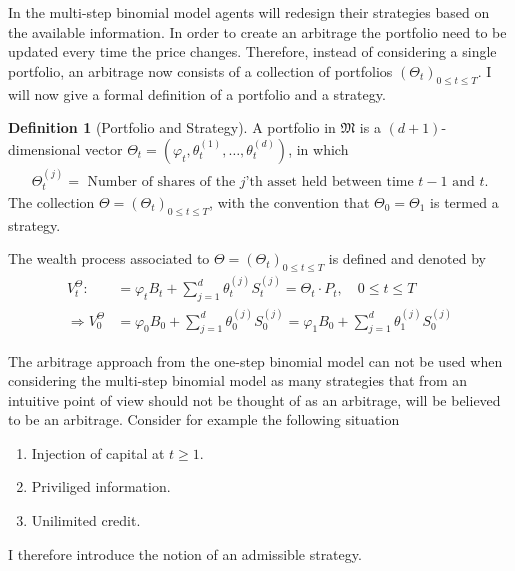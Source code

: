 \documentclass{article}
\theoremstyle{definition}
\newtheorem{definition}[theorem]{Definition}
\numberwithin{equation}{section}
\begin{document}
In the multi-step binomial model agents will redesign their strategies based on the available information.
In order to create an arbitrage the portfolio need to be updated every time the price changes.
Therefore, instead of considering a single portfolio, an arbitrage now consists of a collection of portfolios $\left(\Theta_t\right)_{0 \leq t \leq T}$.
I will now give a formal definition of a portfolio and a strategy.
\begin{definition}[Portfolio and Strategy]
    A portfolio in $\mathfrak{M}$ is a $(d + 1)$-dimensional vector $\Theta_t = \left(\varphi_t, \theta_t^{(1)}, \ldots, \theta_t^{(d)}\right)$, in which
    \begin{align}
        \Theta_t^{(j)} = \text{ Number of shares of the $j$'th asset held between time $t - 1$ and $t$.}
    \end{align}
    The collection $\Theta = \left(\Theta_t\right)_{0 \leq t \leq T}$, with the convention that $\Theta_0 = \Theta_1$ is termed a strategy.
    
    The wealth process associated to $\Theta = \left(\Theta_t\right)_{0\leq t \leq T}$ is defined and denoted by
    \begin{align}
        V_t^\Theta :&= \varphi_tB_t + \sum_{j = 1}^d\theta_t^{(j)}S_t^{(j)} = \Theta_t \cdot P_t, \quad 0 \leq t \leq T \\
        \Rightarrow V_0^\Theta &= \varphi_0B_0 + \sum_{j = 1}^d\theta_0^{(j)}S_0^{(j)} = \varphi_1B_0 + \sum_{j = 1}^d\theta_1^{(j)}S_0^{(j)} 
    \end{align} 
\end{definition}
The arbitrage approach from the one-step binomial model can not be used when considering the multi-step binomial model as many strategies that from an intuitive point of view should not be thought of as an arbitrage, will be believed to be an arbitrage.
Consider for example the following situation
\begin{enumerate}
    \item Injection of capital at $t \geq 1$.
    \item Priviliged information.
    \item Unilimited credit.
\end{enumerate}
I therefore introduce the notion of an admissible strategy.
\end{document}
